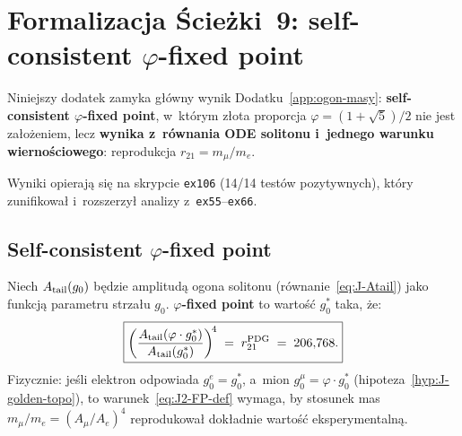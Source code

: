\section{Formalizacja \'Scie\.zki~9: self-consistent $\varphi$-fixed point}%
\label{app:J2-formalizacja}

Niniejszy dodatek zamyka g\l{}\'owny wynik Dodatku~\ref{app:ogon-masy}:
\textbf{self-consistent $\varphi$-fixed point}, w~kt\'orym
z\l{}ota proporcja $\varphi = (1+\sqrt{5})/2$ nie jest
za\l{}o\.zeniem, lecz \textbf{wynika z~r\'ownania ODE solitonu
i~jednego warunku wierno\'sciowego}: reprodukcja $r_{21} = m_\mu/m_e$.

Wyniki opieraj\k{a} si\k{e} na skrypcie \texttt{ex106} (14/14 test\'ow
pozytywnych), kt\'ory zunifikowa\l{} i~rozszerzy\l{} analizy
z~\texttt{ex55}--\texttt{ex66}.

\medskip
\noindent{}
\medskip

\subsection{Self-consistent $\varphi$-fixed point}\label{app:J2-fp}

\begin{definition}\label{def:J2-phi-FP}
Niech $A_{\rm tail}(g_0)$ b\k{e}dzie amplitud\k{a} ogona solitonu
(r\'ownanie~\eqref{eq:J-Atail}) jako funkcj\k{a} parametru strzału
$g_0$. \textbf{$\varphi$-fixed point} to warto\'s\'c $g_0^*$ taka, \.ze:
\begin{equation}\label{eq:J2-FP-def}
  \boxed{\left(\frac{A_{\rm tail}(\varphi \cdot g_0^*)}{A_{\rm tail}(g_0^*)}\right)^{\!4}
  \;=\; r_{21}^{\rm PDG} \;=\; 206{,}768.}
\end{equation}
Fizycznie: je\'sli elektron odpowiada $g_0^e = g_0^*$, a~mion
$g_0^\mu = \varphi \cdot g_0^*$ (hipoteza~\ref{hyp:J-golden-topo}),
to warunek~\eqref{eq:J2-FP-def} wymaga, by stosunek mas
$m_\mu / m_e = (A_\mu / A_e)^4$ reprodukowa\l{}
dok\l{}adnie warto\'s\'c eksperymentaln\k{a}.
\end{definition}

